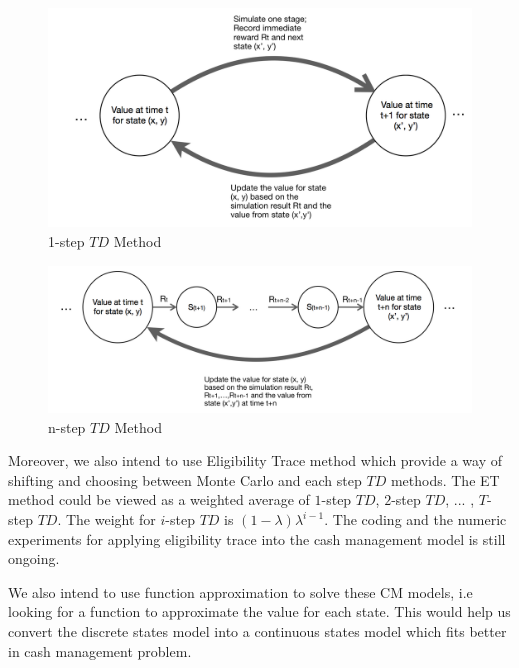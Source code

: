 \documentclass[12pt]{article}
\begin{document}
 \begin{figure}
\begin{center}
\includegraphics[scale=.4]{oneStep}
\end{center}
\caption{1-step $TD$ Method}
\label{oneStep}
\end{figure}


\begin{figure}
\begin{center}
\includegraphics[scale=.4]{nStep}
\end{center}
\caption{n-step $TD$ Method}
\label{nStep}
\end{figure}

Moreover, we also intend to use Eligibility Trace method which provide a way of shifting and choosing between Monte Carlo and each step $TD$ methods. The ET method could be viewed as a weighted average of $1$-step $TD$, $2$-step $TD$, ... , $T$-step $TD$. The weight for $i$-step $TD$ is $(1-\lambda) \lambda ^ {i-1}$. The coding and the numeric experiments for applying eligibility trace into the cash management model is still ongoing.

We also intend to use function approximation to solve these CM models, i.e looking for a function to approximate the value for each state. This would help us convert the discrete states model into a continuous states model which fits better in cash management problem.
\end{document}

